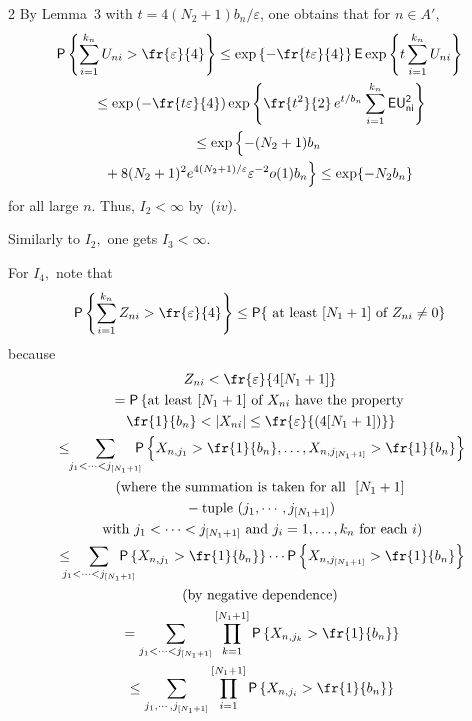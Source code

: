 \begin{multicols}{2}
By Lemma~3 with $t=4(N_2+1)b_n/\varepsilon$,  one obtains that for $n\in A',$
\begin{multline*}
{\sf P}\left\{\sum\limits_{i=1}^{k_n} U_{ni}>\fr{\varepsilon}{4}\right\} 
\le \exp\left\{-\fr{t\varepsilon}{4}\right\}
{\sf E}\exp\left\{t\sum\limits_{i=1}^{k_n}U_{ni}\right\}\\
{}\le\exp\left(-\fr{t\varepsilon}{4}\right) \exp\left\{\fr{t^2}{2}\,e^{t/b_n} 
\sum\limits_{i=1}^{k_n}\sf{E} U_{ni}^2 \right\} \\
\le\exp\left\{-
\vphantom{(N_2 +1)^2 e^{4(N_2+1)/\varepsilon}\varepsilon^{-2}}
(N_2+1)b_n\right.\\
\hspace*{-2.61754pt}\left.{} + 8(N_2 +1)^2 e^{4(N_2+1)/\varepsilon}\varepsilon^{-2}o(1) b_n \right\} \le \exp\{-N_2 b_n\}
\end{multline*}
for all large $n$. Thus, $I_2<\infty$ by~($iv$).

Similarly to $I_2,$ one gets $I_3<\infty.$

For $I_4,$ note that
\begin{equation*}
{\sf P}\left\{\sum\limits_{i=1}^{k_n} Z_{ni}>\fr{\varepsilon}{4}\right\} \le 
{\sf P}\{ \mbox{ at least } 
[N_1 +1] \mbox{ of } Z_{ni}\not= 0\} 
\end{equation*}
because
\begin{multline*}
  Z_{ni}<\fr{\varepsilon}{4[N_1 + 1]}\\
= {\sf P}\left\{\vphantom{\fr{1}{b_n}}\mbox{at least } 
[N_1 +1] \mbox{ of } X_{ni} \mbox{ have the property}\right.\\
\left.\fr{1}{b_n}<|X_{ni}|
\le \fr{\varepsilon}{(4[N_1+1])} \right\} \\
{}\le \!\!\sum\limits_{j_1<\cdots <j_{[N_1+1]}}\!\!\!\! {\sf P}\left\{X_{n,j_1}>\fr{1}{b_n} , \dots, 
X_{n,j_{[N_1+1]}}>\fr{1}{b_n}\right\} \\
\mbox{(where the summation is taken for all }\ [N_1+1]\\
{}- \mbox{tuple } (j_1, \cdots, j_{[N_1+1]}) \\
\mbox{ with } j_1<\cdots <j_{[N_1+1]} \mbox{ and } j_i=1,\dots,k_n \mbox{ for each } i)\\
{}\le\!\! \!\!\!\sum\limits_{j_1<\cdots <j_{[N_1+1]}}\!\!\!\!\!\!\!\! {\sf P}\left\{X_{n,j_1}>\fr{1}{b_n}\right\} 
\cdots {\sf P}\left\{X_{n,j_{[N_1+1]}}>\fr{1}{b_n} \right\}\\
\mbox{(by negative dependence)}\\
{}= \sum\limits_{j_1<\cdots <j_{[N_1+1]}} \prod\limits_{k=1}^{[N_1+1]}  {\sf P}\left\{X_{n,j_k}>\fr{1}{b_n}\right\} \\
{}\le \sum\limits_{j_1, \cdots, j_{[N_1+1]}} \prod\limits_{i=1}^{[N_1+1]}{\sf  P}\left\{X_{n,j_i}>\fr{1}{b_n}\right\} \\
\end{multline*}


\end{multicols}
